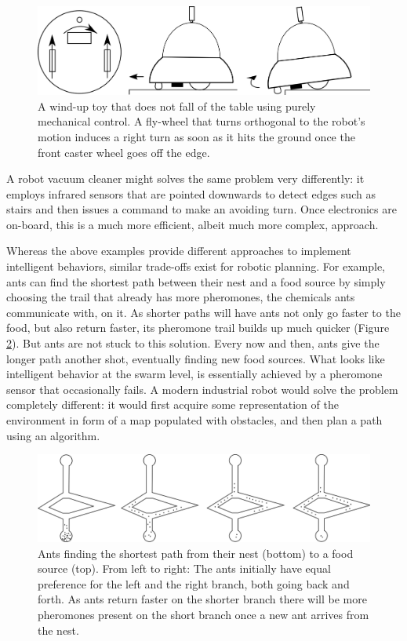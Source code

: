 \begin{figure}
	\centering
		\includegraphics[width=\textwidth]{figs/winduptoysketch.png}
	\caption{A wind-up toy that does not fall of the table using purely mechanical control. A fly-wheel that turns orthogonal to the robot's motion induces a right turn as soon as it hits the ground once the front caster wheel goes off the edge.}
	\label{fig:winduptoy}
\end{figure}

A robot vacuum cleaner might solves the same problem very differently: it employs infrared sensors that are pointed downwards to detect edges such as stairs and then issues a command to make an avoiding turn. Once electronics are on-board, this is a much more efficient, albeit much more complex, approach.

Whereas the above examples provide different approaches to implement intelligent behaviors, similar trade-offs exist for robotic planning. For example, ants can find the shortest path between their nest and a food source by simply choosing the trail that already has more pheromones, the chemicals ants communicate with, on it. As shorter paths will have ants not only go faster to the food, but also return faster, its pheromone trail builds up much quicker (Figure \ref{fig:ants}). But ants are not stuck to this solution. Every now and then, ants give the longer path another shot, eventually finding new food sources. What looks like intelligent behavior at the swarm level, is essentially achieved by a pheromone sensor that occasionally fails. A modern industrial robot would solve the problem completely different: it would first acquire some representation of the environment in form of a map populated with obstacles, and then plan a path using an algorithm.

\begin{figure}
	\centering
		\includegraphics[width=\textwidth]{figs/ants.png}
	\caption{Ants finding the shortest path from their nest (bottom) to a food source (top). From left to right: The ants initially have equal preference for the left and the right branch, both going back and forth. As ants return faster on the shorter branch there will be more pheromones present on the short branch once a new ant arrives from the nest.}
	\label{fig:ants}
\end{figure}

